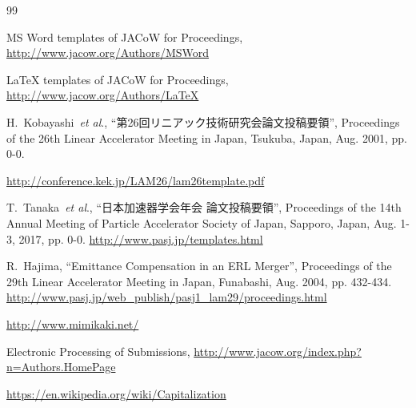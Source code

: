 \documentclass{PASJ2024}
\begin{document}
%
\begin{thebibliography}{99}

MS Word templates of JACoW for Proceedings,
\url{http://www.jacow.org/Authors/MSWord}

LaTeX templates of JACoW for Proceedings,
\url{http://www.jacow.org/Authors/LaTeX}

H.~Kobayashi~\textit{et al}., ``第26回リニアック技術研究会論文投稿要領'', Proceedings of the 26th Linear Accelerator Meeting in Japan, Tsukuba, Japan, Aug. 2001, pp. 0-0.

\url{http://conference.kek.jp/LAM26/lam26template.pdf}

T.~Tanaka~\textit{et al}., ``日本加速器学会年会 論文投稿要領'', Proceedings of the 14th Annual Meeting of Particle Accelerator Society of Japan, Sapporo, Japan, Aug. 1-3, 2017, pp. 0-0. \url{http://www.pasj.jp/templates.html}

R.~Hajima, ``Emittance Compensation in an ERL Merger'', Proceedings of the 29th Linear Accelerator Meeting in Japan, Funabashi, Aug. 2004, pp. 432-434. \url{http://www.pasj.jp/web_publish/pasj1_lam29/proceedings.html}

\url{http://www.mimikaki.net/}

Electronic Processing of Submissions, \url{http://www.jacow.org/index.php?n=Authors.HomePage}

\url{https://en.wikipedia.org/wiki/Capitalization}


\end{thebibliography}
\end{document}
